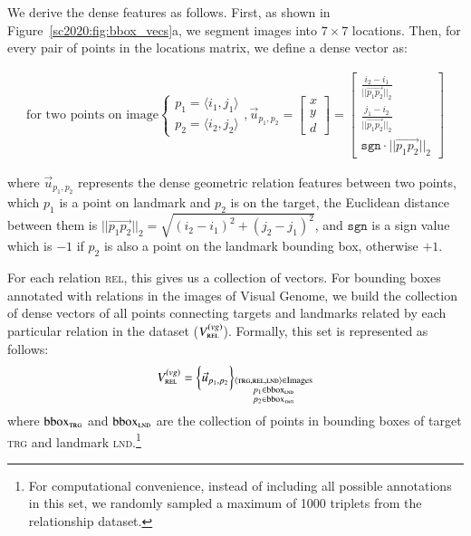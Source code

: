 We derive the dense features as follows. First, as shown in
Figure~\ref{sc2020:fig:bbox_vecs}a, we segment images into $7 \times 7$
locations. Then, for every
pair of points in the locations matrix, we define a dense vector as:

\begin{align*}
	\text{for two points on image}
	\begin{cases}
		p_1 = \langle i_1, j_1\rangle\\
		p_2 = \langle i_2, j_2\rangle
	\end{cases}, 
	\vec{u}_{p_1, p_2} = \begin{bmatrix}
	x \\
	y \\
	d 
	\end{bmatrix} = \begin{bmatrix}
	\frac{i_{2} - i_{1}}{||\overrightarrow{p_1 p_2}||_2} \\
	\frac{j_{1} - i_{2}}{||\overrightarrow{p_1 p_2}||_2} \\
	\mathtt{sgn} \cdot ||\overrightarrow{p_1 p_2}||_2
	\end{bmatrix}
\end{align*}

\noindent where $\vec{u}_{p_1, p_2}$ represents the dense geometric relation
features between two points, which $p_1$ is a point on landmark and $p_2$ is on the target, the Euclidean distance between them is $||\overrightarrow{p_1 p_2}||_2 = \sqrt{(i_{2} - i_{1})^2+(j_{2} - j_{1})^2}$, and $\mathtt{sgn}$ is a sign value which is $-1$ if $p_2$ is also a point on the landmark bounding box, otherwise $+1$.



For each relation \textsc{rel}, this gives us a collection of vectors.
For bounding boxes annotated with relations in the images of Visual Genome,
we build the collection of dense vectors of all points connecting
targets and landmarks related by each particular relation in the dataset
($V_{\textsc{rel}}^{(vg)}$). 
Formally, this
set is represented as follows:
\begin{align}
V_{\textsc{rel}}^{(vg)} = \bigg\{ \vec{u}_{p_1, p_2} \bigg\}_{\substack{
		\langle \textsc{trg},\textsc{rel}, \textsc{lnd} \rangle \in \mathrm{Images} \\
		p_1 \in \mathrm{bbox}_\textsc{lnd} \\
		p_2 \in \mathrm{bbox}_\textsc{trg}
}}
\end{align}
\noindent where $\mathrm{bbox}_\textsc{trg}$ and $\mathrm{bbox}_\textsc{lnd}$ are the collection of points in bounding boxes of target \textsc{trg} and landmark \textsc{lnd}.\footnote{For computational convenience, instead of including all possible annotations in this set, we randomly sampled a maximum of 1000 triplets from the relationship dataset.}

